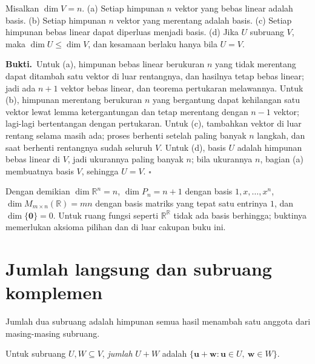 \begin{akibat}
Misalkan $\dim V=n$. (a) Setiap himpunan $n$ vektor yang bebas linear adalah basis.
(b) Setiap himpunan $n$ vektor yang merentang adalah basis. (c) Setiap himpunan bebas linear
dapat diperluas menjadi basis. (d) Jika $U$ subruang $V$, maka $\dim U\le\dim V$, dan
kesamaan berlaku hanya bila $U=V$.
\end{akibat}

\par\medskip\noindent\textbf{Bukti.}\ 
Untuk (a), himpunan bebas linear berukuran $n$ yang tidak merentang dapat ditambah satu
vektor di luar rentangnya, dan hasilnya tetap bebas linear; jadi ada $n+1$ vektor bebas
linear, dan teorema pertukaran melawannya. Untuk (b), himpunan merentang berukuran $n$ yang
bergantung dapat kehilangan satu vektor lewat lemma ketergantungan dan tetap merentang dengan
$n-1$ vektor; lagi-lagi bertentangan dengan pertukaran. Untuk (c), tambahkan vektor di luar
rentang selama masih ada; proses berhenti setelah paling banyak $n$ langkah, dan saat berhenti
rentangnya sudah seluruh $V$. Untuk (d), basis $U$ adalah himpunan bebas linear di $V$, jadi
ukurannya paling banyak $n$; bila ukurannya $n$, bagian (a) membuatnya basis $V$, sehingga
$U=V$.
\hfill$\square$\par\medskip

Dengan demikian $\dim\mathbb{R}^{n}=n$, $\dim P_{n}=n+1$ dengan basis $1,x,\dots,x^{n}$,
$\dim M_{m\times n}(\mathbb{R})=mn$ dengan basis matriks yang tepat satu entrinya $1$, dan
$\dim\{\mathbf{0}\}=0$. Untuk ruang fungsi seperti $\mathbb{R}^{\mathbb{R}}$ tidak ada basis
berhingga; buktinya memerlukan aksioma pilihan dan di luar cakupan buku ini.



\section{Jumlah langsung dan subruang komplemen}

Jumlah dua subruang adalah himpunan semua hasil menambah satu anggota dari masing-masing
subruang.

\begin{definisi}
Untuk subruang $U,W\subseteq V$, \emph{jumlah} $U+W$ adalah
$\{\mathbf{u}+\mathbf{w}:\mathbf{u}\in U,\ \mathbf{w}\in W\}$.
\end{definisi}

